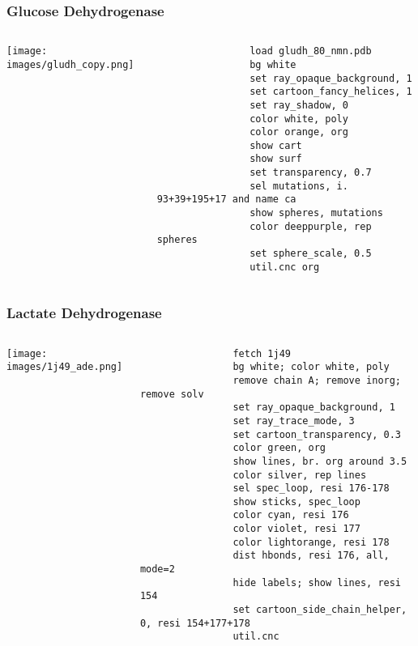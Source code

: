 \documentclass[aspectratio=169]{beamer}
\begin{document}
\begin{frame}[fragile]
\frametitle{Glucose Dehydrogenase}
    \begin{columns}
        \begin{column}{0.50\textwidth}
            \texttt{[image: images/gludh\_copy.png]}
        \end{column}
        \begin{column}{0.50\textwidth}
            \begin{lstlisting}
                load gludh_80_nmn.pdb
                bg white
                set ray_opaque_background, 1
                set cartoon_fancy_helices, 1
                set ray_shadow, 0
                color white, poly
                color orange, org
                show cart
                show surf
                set transparency, 0.7
                sel mutations, i. 93+39+195+17 and name ca
                show spheres, mutations
                color deeppurple, rep spheres
                set sphere_scale, 0.5
                util.cnc org
            \end{lstlisting}
        \end{column}
    \end{columns}
\end{frame}

\begin{frame}[fragile]
\frametitle{Lactate Dehydrogenase}
    \begin{columns}
        \begin{column}{0.50\textwidth}
            \texttt{[image: images/1j49\_ade.png]}
        \end{column}
        \begin{column}{0.50\textwidth}
            \vspace*{-0.5cm}
            \begin{lstlisting}
                fetch 1j49 
                bg white; color white, poly
                remove chain A; remove inorg; remove solv
                set ray_opaque_background, 1
                set ray_trace_mode, 3
                set cartoon_transparency, 0.3
                color green, org
                show lines, br. org around 3.5
                color silver, rep lines
                sel spec_loop, resi 176-178
                show sticks, spec_loop
                color cyan, resi 176
                color violet, resi 177
                color lightorange, resi 178
                dist hbonds, resi 176, all, mode=2
                hide labels; show lines, resi 154
                set cartoon_side_chain_helper, 0, resi 154+177+178
                util.cnc
            \end{lstlisting}
        \end{column}
    \end{columns}
\end{frame}
\end{document}
